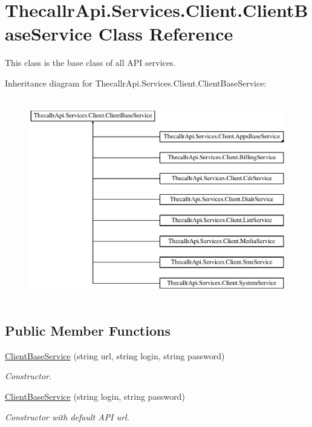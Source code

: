 \hypertarget{class_thecallr_api_1_1_services_1_1_client_1_1_client_base_service}{\section{Thecallr\+Api.\+Services.\+Client.\+Client\+Base\+Service Class Reference}
\label{class_thecallr_api_1_1_services_1_1_client_1_1_client_base_service}
}


This class is the base class of all A\+P\+I services.  


Inheritance diagram for Thecallr\+Api.\+Services.\+Client.\+Client\+Base\+Service\+:\begin{figure}[H]
\begin{center}
\leavevmode
\includegraphics[height=8.904593cm]{class_thecallr_api_1_1_services_1_1_client_1_1_client_base_service}
\end{center}
\end{figure}
\subsection*{Public Member Functions}
\begin{DoxyCompactItemize}
\item 
\hyperlink{class_thecallr_api_1_1_services_1_1_client_1_1_client_base_service_a61666e19d3572249fb24ddcab17bdf7e}{Client\+Base\+Service} (string url, string login, string password)
\begin{DoxyCompactList}\small\item\em Constructor. \end{DoxyCompactList}\item 
\hyperlink{class_thecallr_api_1_1_services_1_1_client_1_1_client_base_service_a3064bd866a10596f73983a19090995f9}{Client\+Base\+Service} (string login, string password)
\begin{DoxyCompactList}\small\item\em Constructor with default A\+P\+I url. \end{DoxyCompactList}\end{DoxyCompactItemize}
